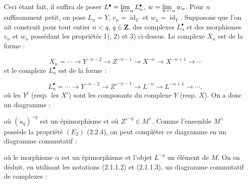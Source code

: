 \clearpage
{}%
\begingroup\small\setlength{\parskip}{0pt}\setlength{\emergencystretch}{1.5em}
\setlength{\abovedisplayskip}{4pt plus 2pt minus 2pt}%
\setlength{\belowdisplayskip}{4pt plus 2pt minus 2pt}%

Ceci étant fait, il suffira de poser
$L^\bullet=\varprojlim_n L_n^\bullet$,
$w=\varprojlim_n w_n$. Pour $n$ suffisamment petit, on pose
$L_n=Y$, $v_n=\operatorname{id}_Y$ et
$w_n=\operatorname{id}_Y$. Supposons que l'on ait construit pour tout entier
$n<q$, $q\in\mathbf Z$, des complexes $L_n^\bullet$ et des morphismes $v_n$
et $w_n$ possédant les propriétés 1), 2) et 3) ci-dessus. Le complexe $X_n$
est de la forme :

\[
X_n=\cdots\longrightarrow Y^{-n-2}\longrightarrow Z^{-n-1}
\longrightarrow X^{-n}\longrightarrow X^{-n+1}\longrightarrow\cdots
\]
et le complexe $L_n^\bullet$ est de la forme :

\[
L_n^\bullet=\cdots\longrightarrow Y^{-n-2}\longrightarrow Z'^{-n-1}
\longrightarrow L^{-n}\longrightarrow L^{-n+1}\longrightarrow\cdots,
\]
où les $Y^i$ (resp.\ les $X^i$) sont les composants du complexe $Y$
(resp. $X$). On a donc un diagramme :

\begin{center}
\end{center}
où $(\dot u_q)^{-q}$ est un épimorphisme et où $Z'^{-q}\in M^\wedge$.
Comme l'ensemble $M^\wedge$ possède la propriété $(E_2)$ (2.2.4), on peut
compléter ce diagramme en un diagramme commutatif :

\begin{center}
\end{center}
où le morphisme $\alpha$ est un épimorphisme et l'objet $L^{-q}$ un élément
de $M$. On en déduit, en utilisant les notations (2.1.1.2) et (2.1.1.3), un
diagramme commutatif de complexes :

\begin{center}
\end{center}
\endgroup
